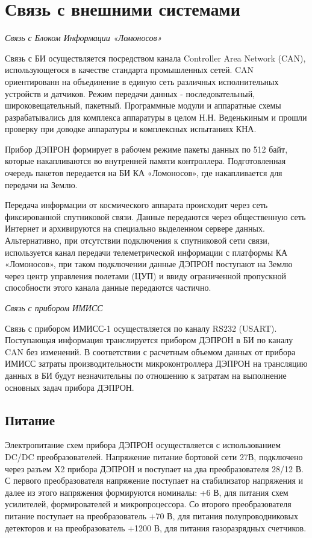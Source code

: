\section{Связь с внешними системами}
\emph{Связь с Блоком Информации «Ломоносов»}

Связь с БИ осуществляется посредством канала Controller Area Network (CAN), использующегося в качестве стандарта промышленных сетей. CAN ориентированн на объединение в единую сеть различных исполнительных устройств и датчиков. Режим передачи данных - последовательный, широковещательный, пакетный. Программные модули и аппаратные схемы разрабатывались для комплекса аппаратуры в целом Н.Н. Веденькиным и прошли проверку при доводке аппаратуры и комплексных испытаниях КНА.

Прибор ДЭПРОН формирует в рабочем режиме пакеты данных по 512 байт, которые накапливаются во внутренней памяти контроллера. Подготовленная очередь пакетов  передается на БИ КА «Ломоносов», где накапливается для передачи на Землю.

Передача информации от космического аппарата происходит через сеть фиксированной спутниковой связи. Данные передаются через общественную сеть Интернет и архивируются на специально выделенном сервере данных. Альтернативно, при отсутствии подключения к спутниковой сети связи, используется канал передачи телеметрической информации с платформы КА «Ломоносов», при таком подключении данные ДЭПРОН поступают на Землю через центр управления полетами (ЦУП) и ввиду ограниченной пропускной способности этого канала данные передаются частично.

\emph{Связь с прибором ИМИСС}

Связь с прибором ИМИСС-1 осуществляется по каналу RS232 (USART). Поступающая информация транслируется прибором ДЭПРОН в БИ по каналу CAN без изменений. В соответствии с расчетным объемом данных от прибора ИМИСС затраты производительности микроконтроллера ДЭПРОН на трансляцию данных в БИ будут незначительны по отношению к затратам на выполнение основных задач прибора ДЭПРОН.

\subsection{Питание}

Электропитание схем прибора ДЭПРОН осуществляется с использованием DC/DC преобразователей. Напряжение питание бортовой сети 27В, подключено через разъем Х2 прибора ДЭПРОН и поступает на два преобразователя 28/12 В. С первого преобразователя напряжение поступает на стабилизатор напряжения и далее из этого напряжения формируются номиналы: +6 В, для питания схем усилителей, формирователей и микропроцессора. Со второго преобразователя питание поступает на преобразователь +70 В, для питания полупроводниковых детекторов и на преобразователь +1200 В, для питания газоразрядных счетчиков. 

